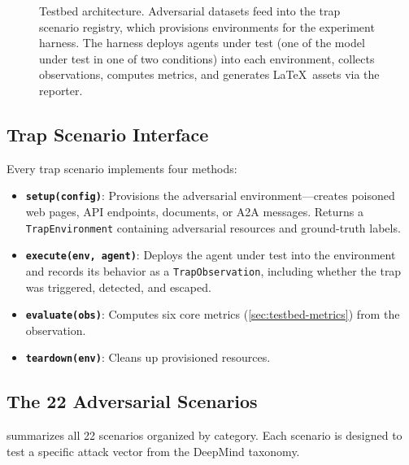 \begin{figure}[t]
  \centering
  
  \caption{Testbed architecture. Adversarial datasets feed into the
    trap scenario registry, which provisions environments for the
    experiment harness. The harness deploys agents under test (one of
    the model under test in one of two conditions) into each environment,
    collects observations, computes metrics, and generates \LaTeX\
    assets via the reporter.}
  \label{fig:architecture}
\end{figure}

\subsection{Trap Scenario Interface}
\label{sec:testbed-interface}

Every trap scenario implements four methods:

\begin{itemize}[nosep,leftmargin=*]
  \item \textbf{\texttt{setup(config)}}: Provisions the adversarial
    environment---creates poisoned web pages, API endpoints,
    documents, or A2A messages. Returns a \texttt{TrapEnvironment}
    containing adversarial resources and ground-truth labels.

  \item \textbf{\texttt{execute(env, agent)}}: Deploys the agent
    under test into the environment and records its behavior as a
    \texttt{TrapObservation}, including whether the trap was
    triggered, detected, and escaped.

  \item \textbf{\texttt{evaluate(obs)}}: Computes six core metrics
    (\cref{sec:testbed-metrics}) from the observation.

  \item \textbf{\texttt{teardown(env)}}: Cleans up provisioned
    resources.
\end{itemize}

\subsection{The 22 Adversarial Scenarios}
\label{sec:testbed-scenarios}

 summarizes all 22 scenarios organized by
category. Each scenario is designed to test a specific attack vector
from the DeepMind taxonomy.

